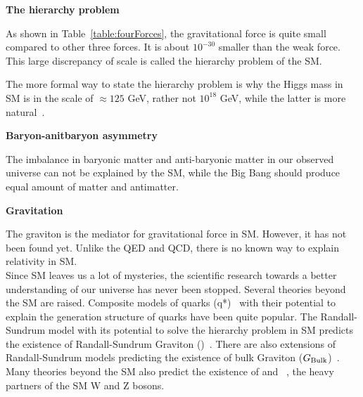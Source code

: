 {\bf The hierarchy problem}

As shown in Table~\ref{table:fourForces}, the gravitational force is quite small compared 
to other three forces. It is about $10^{-30}$ smaller than the weak force. 
This large discrepancy of scale is called the 
hierarchy problem of the SM. 

The more formal way to state the hierarchy problem is why the Higgs mass in SM is in the scale of
${\approx}125$ GeV, 
rather not $10^{18}$ GeV, while the latter is more natural~\cite{wb:hierarchy}. 

{\bf Baryon-anitbaryon asymmetry }

The imbalance in baryonic matter and anti-baryonic matter in our observed universe
can not be explained by the SM, while the Big Bang should produce equal amount of 
matter and antimatter. 


{\bf Gravitation}

 The graviton is the mediator for gravitational force in SM. However, it has not been found yet. 
 Unlike the QED and QCD, there is no known way to explain relativity in SM. 
 \\
 
 
Since SM leaves us a lot of mysteries,  the scientific research towards a better understanding of 
 our universe has never been stopped. Several theories beyond the SM are raised. 
 Composite models of quarks (q*)~\cite{ref_qstar, ref_qstar2} with their potential to explain the generation structure of 
quarks have been quite popular. The Randall-Sundrum model with its potential to solve the
hierarchy problem in SM predicts the existence of 
Randall-Sundrum Graviton (\GRS)~\cite{rs1,Randall:1999vf}. 
There are also extensions of Randall-Sundrum models predicting the existence of 
bulk Graviton ($G_\mathrm{Bulk}$)~\cite{GravitonWWZZ1,GravitonWWZZ2,GravitonWWZZ3}. Many theories beyond the SM also predict the existence of 
\wpr and \zpr~\cite{egm}, the heavy partners of the SM W and Z bosons. 

